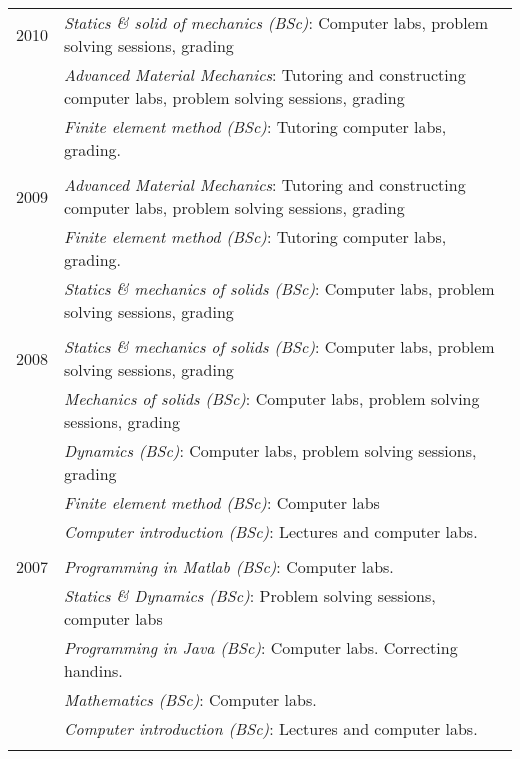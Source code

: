 \documentclass[a4paper,10pt]{article} %
\begin{document}
{\begin{tabular}{r|p{11cm}}

\textsc{2010} 
              & \emph{Statics \& solid of mechanics (BSc)}: \footnotesize{Computer labs, problem solving sessions, grading}\\
              & \emph{Advanced Material Mechanics}: \footnotesize{Tutoring and constructing computer labs, problem solving sessions, grading}\\
              & \emph{Finite element method (BSc)}: \footnotesize{Tutoring computer labs, grading.}\\
\multicolumn{2}{c}{} \\


\textsc{2009} 
              & \emph{Advanced Material Mechanics}: \footnotesize{Tutoring and constructing computer labs, problem solving sessions, grading}\\
              & \emph{Finite element method (BSc)}: \footnotesize{Tutoring computer labs, grading.}\\
              & \emph{Statics \& mechanics of solids (BSc)}: \footnotesize{Computer labs, problem solving sessions, grading}\\
\multicolumn{2}{c}{} \\


\textsc{2008} 
              & \emph{Statics \& mechanics of solids (BSc)}: \footnotesize{Computer labs, problem solving sessions, grading}\\
              & \emph{Mechanics of solids (BSc)}: \footnotesize{Computer labs, problem solving sessions, grading}\\
              & \emph{Dynamics (BSc)}: \footnotesize{Computer labs, problem solving sessions, grading}\\
              & \emph{Finite element method (BSc)}: \footnotesize{Computer labs}\\
              & \emph{Computer introduction (BSc)}: \footnotesize{Lectures and computer labs.}\\
\multicolumn{2}{c}{} \\


\textsc{2007} 
              & \emph{Programming in Matlab (BSc)}: \footnotesize{Computer labs.}\\
              & \emph{Statics \& Dynamics (BSc)}: \footnotesize{Problem solving sessions, computer labs}\\
              & \emph{Programming in Java (BSc)}: \footnotesize{Computer labs. Correcting handins.}\\
              & \emph{Mathematics (BSc)}: \footnotesize{Computer labs.}\\
              & \emph{Computer introduction (BSc)}: \footnotesize{Lectures and computer labs.}\\
\multicolumn{2}{c}{} \\


\end{tabular}}
\end{document}
